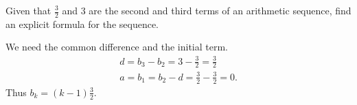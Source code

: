 \begin{example}
    Given that \(\frac{3}{2}\) and \(3\) are the second and third terms of an arithmetic sequence, find an explicit formula for the sequence.
    \begin{solution}
        We need the common difference and the initial term.
        \begin{gather*}
        d = b_3 - b_2 = 3- \frac{3}{2} = \frac{3}{2}\\
        a = b_1 = b_2 - d = \frac{3}{2} - \frac{3}{2} =0.
        \end{gather*}
        Thus \(b_k = \left(k-1\right)\frac{3}{2}.\)
    \end{solution}
\end{example}